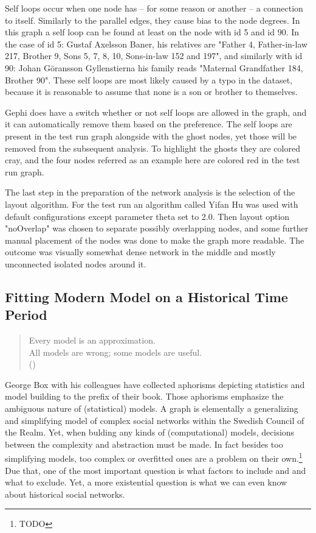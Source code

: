 Self loops occur when one node has – for some reason or another – a connection to itself. Similarly to the parallel edges, they cause bias to the node degrees. In this graph a self loop can be found at least on the node with id 5 and id 90. In the case of id 5: Gustaf Axelsson Baner, his relatives are "Father 4, Father-in-law 217, Brother 9, Sons 5, 7, 8, 10, Sons-in-law 152 and 197", and similarly with id 90: Johan Göransson Gyllenstierna his family reads "Maternal Grandfather 184, Brother 90". These self loops are most likely caused by a typo in the dataset, because it is reasonable to assume that none is a son or brother to themselves.
 
Gephi does have a switch whether or not self loops are allowed in the graph, and it can automatically remove them based on the preference. The self loops are present in the test run graph alongside with the ghost nodes, yet those will be removed from the subsequent analysis. To highlight the ghosts they are colored cray, and the four nodes referred as an example here are colored red in the test run graph.

The last step in the preparation of the network analysis is the selection of the layout algorithm. For the test run an algorithm called Yifan Hu was used with default configurations except parameter theta set to 2.0. Then layout option "noOverlap" was chosen to separate possibly overlapping nodes, and some further manual placement of the nodes was done to make the graph more readable. The outcome was visually somewhat dense network in the middle and mostly unconnected isolated nodes around it. 

\subsection{Fitting Modern Model on a Historical Time Period}
\label{background}
\begin{quote}
	Every model is an approximation.\\
	All models are wrong; some models are useful.\\
	(\cite[prefix]{statisticsfor})
\end{quote}

George Box with his colleagues have collected aphorisms depicting statistics and model building to the prefix of their book. Those aphorisms emphasize the ambiguous nature of (statistical) models. A graph is elementally a generalizing and simplifying model of complex social networks within the Swedish Council of the Realm. Yet, when bulding any kinds of (computational) models, decisions between the complexity and abstraction must be made. In fact besides too simplifying models, too complex or overfitted ones are a problem on their own.\footnote{TODO} Due that, one of the most important question is what factors to include and and what to exclude. Yet, a more existential question is what we can even know about historical social networks. 

